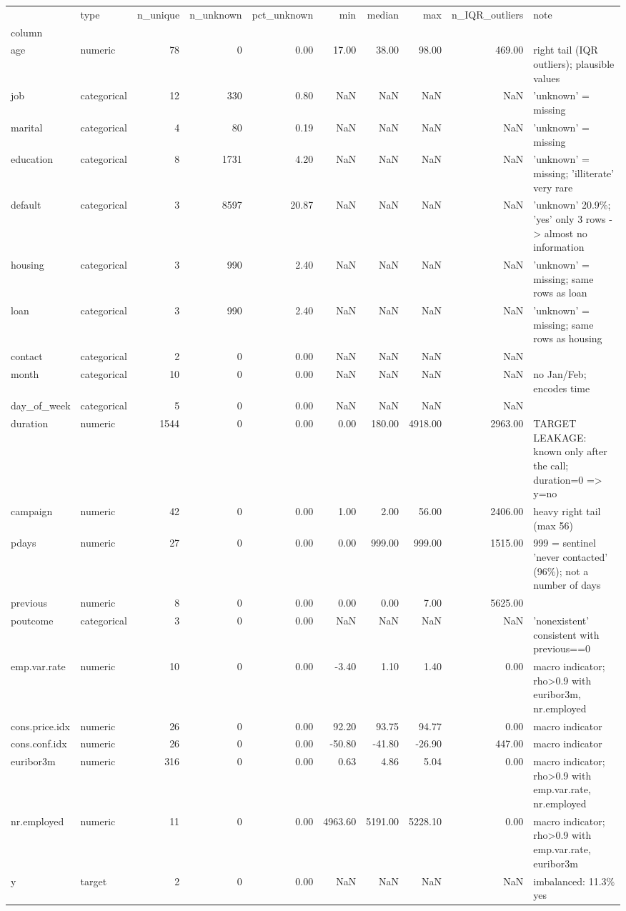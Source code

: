 \begin{tabular}{llrrrrrrrl}
\toprule
 & type & n\_unique & n\_unknown & pct\_unknown & min & median & max & n\_IQR\_outliers & note \\
column &  &  &  &  &  &  &  &  &  \\
\midrule
age & numeric & 78 & 0 & 0.00 & 17.00 & 38.00 & 98.00 & 469.00 & right tail (IQR outliers); plausible values \\
job & categorical & 12 & 330 & 0.80 & NaN & NaN & NaN & NaN & 'unknown' = missing \\
marital & categorical & 4 & 80 & 0.19 & NaN & NaN & NaN & NaN & 'unknown' = missing \\
education & categorical & 8 & 1731 & 4.20 & NaN & NaN & NaN & NaN & 'unknown' = missing; 'illiterate' very rare \\
default & categorical & 3 & 8597 & 20.87 & NaN & NaN & NaN & NaN & 'unknown' 20.9\%; 'yes' only 3 rows -> almost no information \\
housing & categorical & 3 & 990 & 2.40 & NaN & NaN & NaN & NaN & 'unknown' = missing; same rows as loan \\
loan & categorical & 3 & 990 & 2.40 & NaN & NaN & NaN & NaN & 'unknown' = missing; same rows as housing \\
contact & categorical & 2 & 0 & 0.00 & NaN & NaN & NaN & NaN &  \\
month & categorical & 10 & 0 & 0.00 & NaN & NaN & NaN & NaN & no Jan/Feb; encodes time \\
day\_of\_week & categorical & 5 & 0 & 0.00 & NaN & NaN & NaN & NaN &  \\
duration & numeric & 1544 & 0 & 0.00 & 0.00 & 180.00 & 4918.00 & 2963.00 & TARGET LEAKAGE: known only after the call; duration=0 => y=no \\
campaign & numeric & 42 & 0 & 0.00 & 1.00 & 2.00 & 56.00 & 2406.00 & heavy right tail (max 56) \\
pdays & numeric & 27 & 0 & 0.00 & 0.00 & 999.00 & 999.00 & 1515.00 & 999 = sentinel 'never contacted' (96\%); not a number of days \\
previous & numeric & 8 & 0 & 0.00 & 0.00 & 0.00 & 7.00 & 5625.00 &  \\
poutcome & categorical & 3 & 0 & 0.00 & NaN & NaN & NaN & NaN & 'nonexistent' consistent with previous==0 \\
emp.var.rate & numeric & 10 & 0 & 0.00 & -3.40 & 1.10 & 1.40 & 0.00 & macro indicator; rho>0.9 with euribor3m, nr.employed \\
cons.price.idx & numeric & 26 & 0 & 0.00 & 92.20 & 93.75 & 94.77 & 0.00 & macro indicator \\
cons.conf.idx & numeric & 26 & 0 & 0.00 & -50.80 & -41.80 & -26.90 & 447.00 & macro indicator \\
euribor3m & numeric & 316 & 0 & 0.00 & 0.63 & 4.86 & 5.04 & 0.00 & macro indicator; rho>0.9 with emp.var.rate, nr.employed \\
nr.employed & numeric & 11 & 0 & 0.00 & 4963.60 & 5191.00 & 5228.10 & 0.00 & macro indicator; rho>0.9 with emp.var.rate, euribor3m \\
y & target & 2 & 0 & 0.00 & NaN & NaN & NaN & NaN & imbalanced: 11.3\% yes \\
\bottomrule
\end{tabular}
